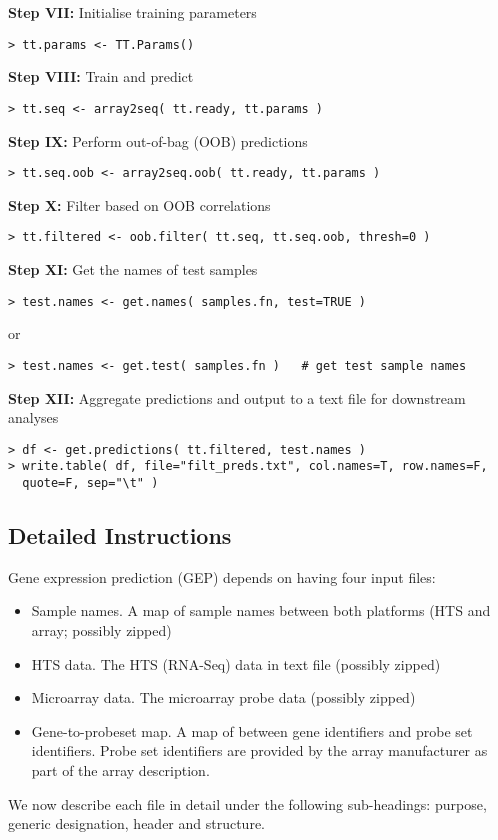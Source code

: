 \documentclass[a4paper,12pt]{article}
\begin{document}
\textbf{Step VII:} Initialise training parameters
\begin{verbatim}
> tt.params <- TT.Params()
\end{verbatim}
\textbf{Step VIII:} Train and predict
\begin{verbatim}
> tt.seq <- array2seq( tt.ready, tt.params )
\end{verbatim}
\textbf{Step IX:} Perform out-of-bag (OOB) predictions
\begin{verbatim}
> tt.seq.oob <- array2seq.oob( tt.ready, tt.params )
\end{verbatim}
\textbf{Step X:} Filter based on OOB correlations
\begin{verbatim}
> tt.filtered <- oob.filter( tt.seq, tt.seq.oob, thresh=0 )
\end{verbatim}
\textbf{Step XI:} Get the names of test samples
\begin{verbatim}
> test.names <- get.names( samples.fn, test=TRUE )
\end{verbatim}
or 
\begin{verbatim}
> test.names <- get.test( samples.fn )   # get test sample names
\end{verbatim}
\textbf{Step XII:} Aggregate predictions and output to a text file for downstream analyses
\begin{verbatim}
> df <- get.predictions( tt.filtered, test.names )
> write.table( df, file="filt_preds.txt", col.names=T, row.names=F, 
  quote=F, sep="\t" )
\end{verbatim}

\subsection{Detailed Instructions}
Gene expression prediction (GEP) depends on having four input files:
\begin{itemize}
\item Sample names. A map of sample names between both platforms (HTS and array; possibly zipped)
\item HTS data. The HTS (RNA-Seq) data in text file (possibly zipped)
\item Microarray data. The microarray probe data (possibly zipped) 
\item Gene-to-probeset map. A map of between gene identifiers and probe set identifiers. Probe set identifiers are provided by the array manufacturer as part of the array description.
\end{itemize}

We now describe each file in detail under the following sub-headings: purpose, generic designation, header and structure.
\end{document}
